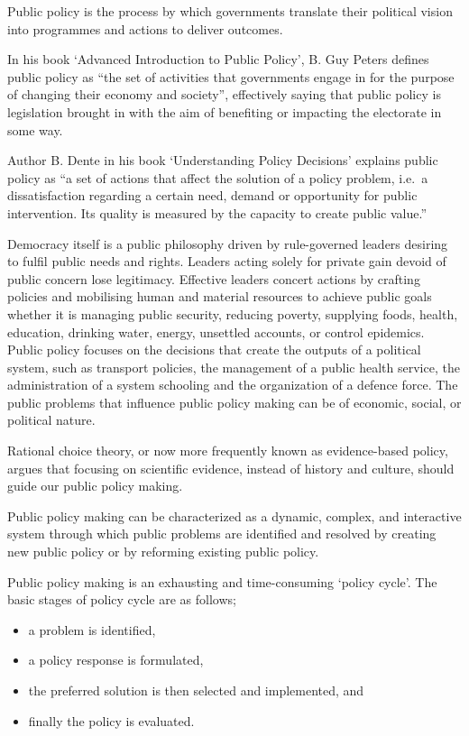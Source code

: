 \documentclass[
  openany]{book}
\providecommand{\tightlist}{%
  \setlength{\itemsep}{0pt}\setlength{\parskip}{0pt}}
\begin{document}
Public policy is the process by which governments translate their political vision into programmes and actions to deliver outcomes.

In his book `Advanced Introduction to Public Policy', B. Guy Peters defines public policy as ``the set of activities that governments engage in for the purpose of changing their economy and society'', effectively saying that public policy is legislation brought in with the aim of benefiting or impacting the electorate in some way.

Author B. Dente in his book `Understanding Policy Decisions' explains public policy as ``a set of actions that affect the solution of a policy problem, i.e.~a dissatisfaction regarding a certain need, demand or opportunity for public intervention. Its quality is measured by the capacity to create public value.''

Democracy itself is a public philosophy driven by rule-governed leaders desiring to fulfil public needs and rights. Leaders acting solely for private gain devoid of public concern lose legitimacy. Effective leaders concert actions by crafting policies and mobilising human and material resources to achieve public goals whether it is managing public security, reducing poverty, supplying foods, health, education, drinking water, energy, unsettled accounts, or control epidemics. Public policy focuses on the decisions that create the outputs of a political system, such as transport policies, the management of a public health service, the administration of a system schooling and the organization of a defence force. The public problems that influence public policy making can be of economic, social, or political nature.

Rational choice theory, or now more frequently known as evidence-based policy, argues that focusing on scientific evidence, instead of history and culture, should guide our public policy making.

Public policy making can be characterized as a dynamic, complex, and interactive system through which public problems are identified and resolved by creating new public policy or by reforming existing public policy.

Public policy making is an exhausting and time-consuming `policy cycle'. The basic stages of policy cycle are as follows;

\begin{itemize}
\tightlist
\item
  a problem is identified,
\item
  a policy response is formulated,
\item
  the preferred solution is then selected and implemented, and
\item
  finally the policy is evaluated.
\end{itemize}
\end{document}
